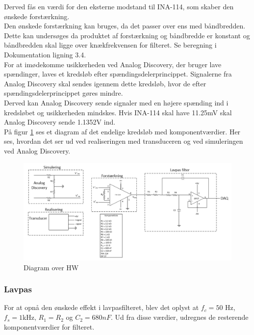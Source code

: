 Derved fås en værdi for den eksterne modstand til INA-114, som skaber den ønskede forstærkning.\\
\newline
Den ønskede forstærkning kan bruges, da det passer over ens med båndbredden. Dette kan undersøges da produktet af forstærkning og båndbredde er konstant og båndbredden skal ligge over knækfrekvensen for filteret. Se beregning i Dokumentation ligning 3.4.\\
\newline 
For at imødekomme usikkerheden ved Analog Discovery, der bruger lave spændinger, laves et kredsløb efter spændingsdelerprincippet. Signalerne fra Analog Discovery skal sendes igennem dette kredsløb, hvor de efter spændingsdelerprincippet gøres mindre.\\  
Derved kan Analog Discovery sende signaler med en højere spænding ind i kredsløbet og usikkerheden mindskes. Hvis INA-114 skal have 11.25mV skal Analog Discovery sende 1.1352V ind.  
\\
\newline 
På figur \ref{fig:HW} ses et diagram af det endelige kredsløb med komponentværdier. Her ses, hvordan det ser ud ved realiseringen med transduceren og ved simuleringen ved Analog Discovery. 
\begin{figure}[H]
	\centering
	\includegraphics[width=1.0\textwidth]{Figurer/diagram_over_HW}
	\caption{Diagram over HW}
	\label{fig:HW}
\end{figure}

\subsubsection{Lavpas}
For at opnå den ønskede effekt i lavpasfilteret, blev det oplyst at $ f_c=50$ Hz, $ f_s = 1$kHz, $ R_1 = R_2 $ og $ C_2=680 nF$. Ud fra disse værdier, udregnes de resterende komponentværdier for filteret.

